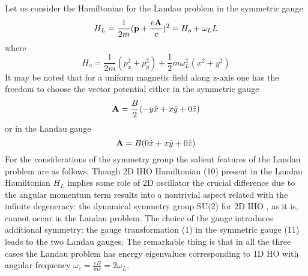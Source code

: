 \documentclass[aps, singlecolumn, showpacs]{revtex4-2}
\begin{document}
Let us consider the Hamiltonian for the Landau problem in the symmetric gauge 
\begin{equation}
H_L = \frac{1}{2m} ({\bf p} +\frac{e{\bf A}}{c})^2 = H_o +\omega_L L
\end{equation}
where 
\begin{equation}
H_o = \frac{1}{2m} (p_x^2 +p_y^2) +\frac{1}{2} m \omega_L^2(x^2 + y^2)
\end{equation}
It may be noted that for a uniform magnetic field along z-axis one has the freedom to choose the vector potential either in the symmetric gauge 
\begin{equation}
{\bf A} =\frac{B}{2} (-y \hat{x} +x \hat{y} +0\hat{z})
\end{equation}
or in the Landau gauge
\begin{equation}
{\bf A} = B (0\hat{x} +x\hat{y} +0\hat{z} )
\end{equation}
For the considerations of the symmetry group the salient features of the Landau problem are as follows. Though 2D IHO Hamiltonian (10) present in the Landau Hamiltonian $H_L$ implies some role of 2D oscillator the crucial difference due to the angular momentum term results into a nontrivial aspect related with the infinite degeneracy: the dynamical symmetry group SU(2) for 2D IHO \cite{19}, as it is, cannot occur in the Landau problem. The choice of the gauge introduces additional symmetry: the gauge transformation (1) in the symmetric gauge (11) leads to the two Landau gauges. The remarkable thing is that in all the three cases the Landau problem has energy eigenvalues corresponding to 1D HO with angular frequency $\omega_c =\frac{e B}{m c}=2 \omega_L$.
\end{document}
